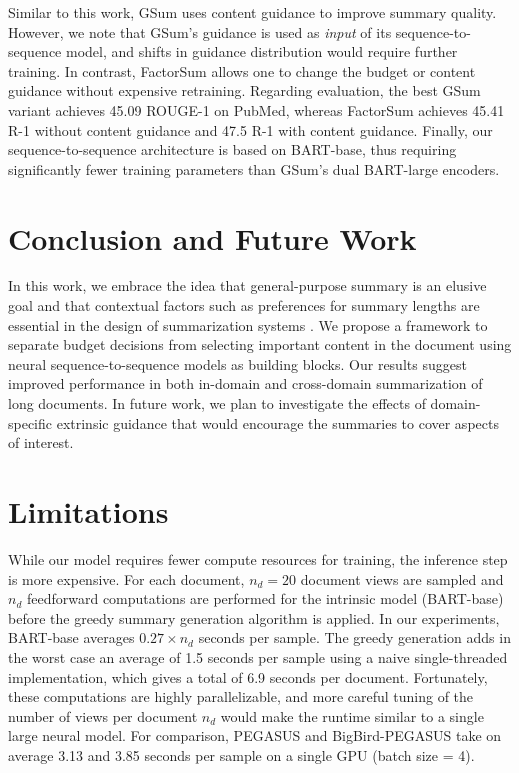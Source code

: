 \documentclass[11pt,table]{article}
\begin{document}
Similar to this work, GSum \citep{dou_gsum_2021} uses content guidance to improve summary quality. However, we note that GSum's guidance is used as \emph{input} of its sequence-to-sequence model, and shifts in guidance distribution would require further training. In contrast, FactorSum allows one to change the budget or content guidance without expensive retraining. Regarding evaluation, the best GSum variant achieves 45.09 ROUGE-1 on PubMed, whereas FactorSum achieves 45.41 R-1 without content guidance and 47.5 R-1 with content guidance. Finally, our sequence-to-sequence architecture is based on BART-base, thus requiring significantly fewer training parameters than GSum's dual BART-large encoders.

\section{Conclusion and Future Work}
In this work, we embrace the idea that general-purpose summary is an elusive goal and that contextual factors such as preferences for summary lengths are essential in the design of summarization systems \citep{jones1999automatic}. We propose a framework to separate budget decisions from selecting important content in the document using neural sequence-to-sequence models as building blocks. Our results suggest improved performance in both in-domain and cross-domain summarization of long documents. In future work, we plan to investigate the effects of domain-specific extrinsic guidance that would encourage the summaries to cover aspects of interest. 

\section*{Limitations}
\label{sec:limitations}
While our model requires fewer compute resources for training, the inference step is more expensive. For each document, $n_d=20$ document views are sampled and $n_d$ feedforward computations are performed for the intrinsic model (BART-base) before the greedy summary generation algorithm is applied. In our experiments, BART-base averages $0.27 \times n_d$ seconds per sample. The greedy generation adds in the worst case an average of 1.5 seconds per sample using a naive single-threaded implementation, which gives a total of 6.9 seconds per document. Fortunately, these computations are highly parallelizable, and more careful tuning of the number of views per document $n_d$ would make the runtime similar to a single large neural model. For comparison, PEGASUS and BigBird-PEGASUS take on average 3.13 and 3.85 seconds per sample on a single GPU (batch size = 4).
\end{document}
